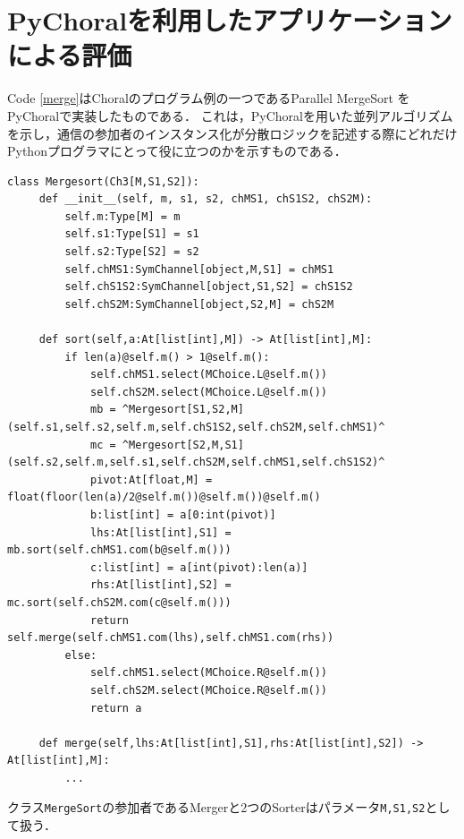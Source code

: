 \documentclass{thesis}
\begin{document}

\chapter{PyChoralを利用したアプリケーションによる評価}
Code \ref{merge}はChoralのプログラム例の一つであるParallel MergeSort \cite{ex_choral}をPyChoralで実装したものである．
これは，PyChoralを用いた並列アルゴリズムを示し，通信の参加者のインスタンス化が分散ロジックを記述する際にどれだけPythonプログラマにとって役に立つのかを示すものである．
\begin{lstlisting}[caption = MergeSort.py, label = merge]
 class Mergesort(Ch3[M,S1,S2]):
     def __init__(self, m, s1, s2, chMS1, chS1S2, chS2M):
         self.m:Type[M] = m
         self.s1:Type[S1] = s1
         self.s2:Type[S2] = s2
         self.chMS1:SymChannel[object,M,S1] = chMS1
         self.chS1S2:SymChannel[object,S1,S2] = chS1S2
         self.chS2M:SymChannel[object,S2,M] = chS2M
 
     def sort(self,a:At[list[int],M]) -> At[list[int],M]:
         if len(a)@self.m() > 1@self.m():
             self.chMS1.select(MChoice.L@self.m())
             self.chS2M.select(MChoice.L@self.m())
             mb = ^Mergesort[S1,S2,M](self.s1,self.s2,self.m,self.chS1S2,self.chS2M,self.chMS1)^
             mc = ^Mergesort[S2,M,S1](self.s2,self.m,self.s1,self.chS2M,self.chMS1,self.chS1S2)^
             pivot:At[float,M] = float(floor(len(a)/2@self.m())@self.m())@self.m()
             b:list[int] = a[0:int(pivot)]
             lhs:At[list[int],S1] = mb.sort(self.chMS1.com(b@self.m()))
             c:list[int] = a[int(pivot):len(a)]
             rhs:At[list[int],S2] = mc.sort(self.chS2M.com(c@self.m()))
             return self.merge(self.chMS1.com(lhs),self.chMS1.com(rhs))
         else:
             self.chMS1.select(MChoice.R@self.m())
             self.chS2M.select(MChoice.R@self.m())
             return a
             
     def merge(self,lhs:At[list[int],S1],rhs:At[list[int],S2]) -> At[list[int],M]:
         ... 
\end{lstlisting}
クラス\texttt{MergeSort}の参加者であるMergerと2つのSorterはパラメータ\texttt{M,S1,S2}として扱う．
\end{document}
